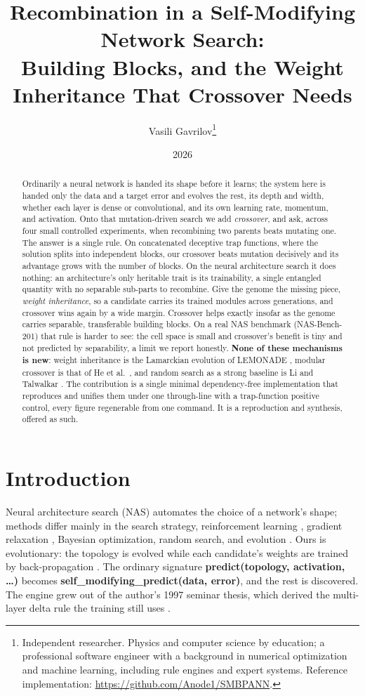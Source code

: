 \documentclass[11pt]{article}
\title{\textbf{Recombination in a Self-Modifying Network Search:\\
Building Blocks, and the Weight Inheritance That Crossover Needs}}
\author{Vasili Gavrilov\thanks{Independent researcher. Physics and computer
science by education; a professional software engineer with a background in
numerical optimization and machine learning, including rule engines and expert
systems. Reference implementation: \url{https://github.com/Anode1/SMBPANN}.}}
\date{2026}
\begin{document}
\maketitle

\begin{abstract}
Ordinarily a neural network is handed its shape before it learns; the system here is
handed only the data and a target error and evolves the rest, its depth and width,
whether each layer is dense or convolutional, and its own learning rate, momentum, and
activation. Onto that mutation-driven search we add \emph{crossover}, and ask, across
four small controlled experiments, when recombining two parents beats mutating one.
The answer is a single rule. On concatenated deceptive trap functions, where the
solution splits into independent blocks, our crossover beats mutation decisively and
its advantage grows with the number of blocks. On the neural architecture search it
does nothing: an architecture's only heritable trait is its trainability, a single
entangled quantity with no separable sub-parts to recombine. Give the genome the
missing piece, \emph{weight inheritance}, so a candidate carries its trained modules
across generations, and crossover wins again by a wide margin. Crossover helps exactly
insofar as the genome carries separable, transferable building blocks. On a real NAS
benchmark (NAS-Bench-201) that rule is harder to see: the cell space is small and
crossover's benefit is tiny and not predicted by separability, a limit we report
honestly. \textbf{None of these mechanisms is new}: weight inheritance is the
Lamarckian evolution of LEMONADE \cite{lemonade2019}, modular crossover is that of He
et al.\ \cite{modxover2021}, and random search as a strong baseline is Li and Talwalkar
\cite{li2019}. The contribution is a single minimal dependency-free implementation that
reproduces and unifies them under one through-line with a trap-function positive
control, every figure regenerable from one command. It is a reproduction and synthesis,
offered as such.
\end{abstract}

\section{Introduction}

Neural architecture search (NAS) automates the choice of a network's shape; methods
differ mainly in the search strategy, reinforcement learning \cite{zoph2017},
gradient relaxation \cite{darts2019}, Bayesian optimization, random search, and
evolution \cite{elsken2019}. Ours is evolutionary: the topology is evolved while each
candidate's weights are trained by back-propagation \cite{real2019}. The ordinary
signature \textbf{predict(topology, activation, \ldots)} becomes
\textbf{self\_modifying\_predict(data, error)}, and the rest is discovered. The engine
grew out of the author's 1997 seminar thesis, which derived the multi-layer delta rule
the training still uses \cite{thesis1997}.
\end{document}
